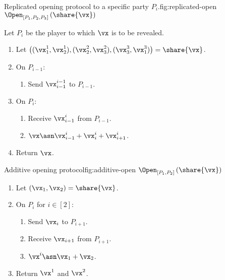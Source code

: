 \begin{Boxfig}{Replicated opening protocol to a specific party $P_i$.}{fig:replicated-open}
  {$\Open_{[P_1, P_2, P_3]} \left( \share{\vx} \right)$}
  
  Let $P_i$ be the player to which $\vx$ is to be revealed.
  
  \begin{enumerate}
  \item Let $\left( (\vx_1^1, \vx_2^1), (\vx_2^2, \vx_3^2), (\vx_3^3, \vx_1^3) \right) = \share{\vx}$.
  \item On $P_{i-1}$:
  \begin{enumerate}
    \item Send $\vx_{i-1}^{i-1}$ to $P_{i-1}$.
  \end{enumerate}
  \item On $P_i$:
  \begin{enumerate}
   \item Receive $\vx_{i-1}^{i}$ from $P_{i-1}$.
   \item $\vx \asn \vx_{i-1}^{i} + \vx_i^i + \vx_{i+1}^{i}$.
  \end{enumerate}
  \item Return $\vx$.
\end{enumerate}
\end{Boxfig}


\begin{Boxfig}{Additive opening protocol}{fig:additive-open}
  {$\Open_{[P_1, P_2]} \left( \share{\vx} \right)$}
  \begin{enumerate}
  \item Let $(\vx_1, \vx_2) = \share{\vx}$.
  \item On $P_i$ for $i \in [2]$:
  \begin{enumerate}
    \item Send $\vx_i$ to $P_{i+1}$.
    \item Receive $\vx_{i+1}$ from $P_{i+1}$.
    \item $\vx^i \asn \vx_1 + \vx_2$.
  \end{enumerate}
  \item Return $\vx^1$ and $\vx^2$.
\end{enumerate}
\end{Boxfig}
